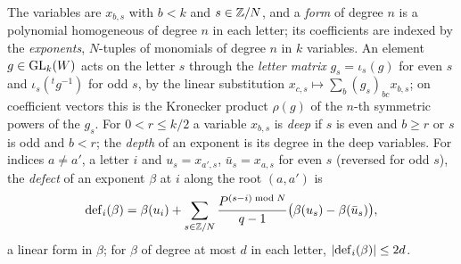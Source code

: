 The variables are $x_{b,s}$ with $b<k$ and $s\in\mathbb{Z}/N$, and a \emph{form} of degree $n$ is a polynomial homogeneous of degree $n$ in each letter;
its coefficients are indexed by the \emph{exponents}, $N$-tuples of monomials of degree $n$ in $k$ variables. An element $g\in\operatorname{GL}_k(W)$ acts on
the letter $s$ through the \emph{letter matrix} $g_s=\iota_s(g)$ for even $s$ and $\iota_s({}^tg^{-1})$ for odd $s$, by the linear substitution
$x_{c,s}\mapsto\sum_b(g_s)_{bc}x_{b,s}$; on coefficient vectors this is the Kronecker product $\rho(g)$ of the $n$-th symmetric powers of the $g_s$.
For $0<r\le k/2$ a variable $x_{b,s}$ is \emph{deep} if $s$ is even and $b\ge r$ or $s$ is odd and $b<r$; the \emph{depth} of an exponent is its
degree in the deep variables. For indices $a\ne a'$, a letter $i$ and $u_s=x_{a',s}$, $\bar u_s=x_{a,s}$ for even $s$ (reversed for odd $s$), the
\emph{defect} of an exponent $\beta$ at $i$ along the root $(a,a')$ is
\[
  \mathrm{def}_i(\beta)=\beta(u_i)+\sum_{s\in\mathbb{Z}/N}\frac{P^{(s-i)\bmod N}}{q-1}\bigl(\beta(u_s)-\beta(\bar u_s)\bigr),
\]
a linear form in $\beta$; for $\beta$ of degree at most $d$ in each letter, $\lvert \mathrm{def}_i(\beta)\rvert\le2d$.

